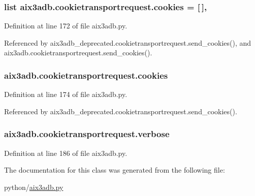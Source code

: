 \subsubsection[{cookies}]{\setlength{\rightskip}{0pt plus 5cm}list aix3adb.\-cookietransportrequest.\-cookies = \mbox{[}$\,$\mbox{]}\hspace{0.3cm}{\ttfamily [static]}, {\ttfamily [inherited]}}\label{classaix3adb_1_1cookietransportrequest_a8ef9827d4856636aa211c8db0eaf7201}


Definition at line 172 of file aix3adb.\-py.



Referenced by aix3adb\-\_\-deprecated.\-cookietransportrequest.\-send\-\_\-cookies(), and aix3adb.\-cookietransportrequest.\-send\-\_\-cookies().

\subsubsection[{cookies}]{\setlength{\rightskip}{0pt plus 5cm}aix3adb.\-cookietransportrequest.\-cookies\hspace{0.3cm}{\ttfamily [inherited]}}\label{classaix3adb_1_1cookietransportrequest_a580ba93ad6177a431eff2307bb2d93bd}


Definition at line 174 of file aix3adb.\-py.



Referenced by aix3adb\-\_\-deprecated.\-cookietransportrequest.\-send\-\_\-cookies().

\subsubsection[{verbose}]{\setlength{\rightskip}{0pt plus 5cm}aix3adb.\-cookietransportrequest.\-verbose\hspace{0.3cm}{\ttfamily [inherited]}}\label{classaix3adb_1_1cookietransportrequest_aa84359ac88f7315c9fabb150f71e5e1b}


Definition at line 186 of file aix3adb.\-py.



The documentation for this class was generated from the following file\-:\begin{DoxyCompactItemize}
\item 
python/\hyperlink{aix3adb_8py}{aix3adb.\-py}\end{DoxyCompactItemize}
